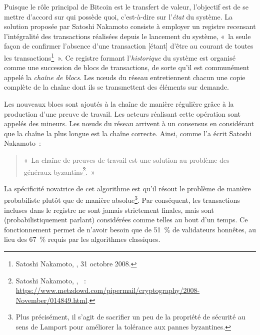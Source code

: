 Puisque le rôle principal de Bitcoin est le transfert de valeur, l'objectif est de se mettre d'accord sur qui possède quoi, c'est-à-dire sur l'\emph{état} du système. La solution proposée par Satoshi Nakamoto consiste à employer un registre recensant l'intégralité des transactions réalisées depuis le lancement du système, «~la seule façon de confirmer l'absence d'une transaction [étant] d'être au courant de toutes les transactions\footnote{Satoshi Nakamoto, , 31 octobre 2008.}~». Ce registre formant l'\emph{historique} du système est organisé comme une succession de blocs de transactions, de sorte qu'il est communément appelé la \emph{chaîne de blocs}. Les nœuds du réseau entretiennent chacun une copie complète de la chaîne dont ils se transmettent des éléments sur demande.

Les nouveaux blocs sont ajoutés à la chaîne de manière régulière grâce à la production d'une preuve de travail. Les acteurs réalisant cette opération sont appelés des mineurs. Les nœuds du réseau arrivent à un consensus en considérant que la chaîne la plus longue est la chaîne correcte. Ainsi, comme l'a écrit Satoshi Nakamoto~:

\vspace{-1em}
\begin{quote}
«~La chaîne de preuves de travail est une solution au problème des généraux byzantins\footnote{Satoshi Nakamoto, , ~: \url{https://www.metzdowd.com/pipermail/cryptography/2008-November/014849.html}.}.~»
\end{quote}

La spécificité novatrice de cet algorithme est qu'il résout le problème de manière probabiliste plutôt que de manière absolue\footnote{Plus précisément, il s'agit de sacrifier un peu de la propriété de sécurité au sens de Lamport pour améliorer la tolérance aux pannes byzantines.}. Par conséquent, les transactions incluses dans le registre ne sont jamais strictement finales, mais sont (probabilistiquement parlant) considérées comme telles au bout d'un temps. Ce fonctionnement permet de n'avoir besoin que de 51~\% de validateurs honnêtes, au lieu des 67~\% requis par les algorithmes classiques.


